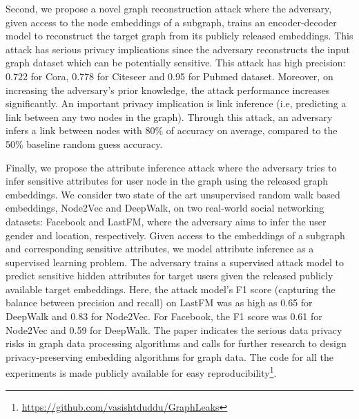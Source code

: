 Second, we propose a novel graph reconstruction attack where the adversary, given access to the node embeddings of a subgraph, trains an encoder-decoder model to reconstruct the target graph from its publicly released embeddings.
This attack has serious privacy implications since the adversary reconstructs the input graph dataset which can be potentially sensitive.
This attack has high precision: 0.722 for Cora, 0.778 for Citeseer and 0.95 for Pubmed dataset.
Moreover, on increasing the adversary's prior knowledge, the attack performance increases significantly.
An important privacy implication is link inference (i.e, predicting a link between any two nodes in the graph).
Through this attack, an adversary infers a link between nodes with 80\% of accuracy on average, compared to the 50\% baseline random guess accuracy.


Finally, we propose the attribute inference attack where the adversary tries to infer sensitive attributes for user node in the graph using the released graph embeddings.
We consider two state of the art unsupervised random walk based embeddings, Node2Vec and DeepWalk, on two real-world social networking datasets: Facebook and LastFM, where the adversary aims to infer the user gender and location, respectively.
Given access to the embeddings of a subgraph and corresponding sensitive attributes, we model attribute inference as a supervised learning problem.
The adversary trains a supervised attack model to predict sensitive hidden attributes for target users given the released publicly available target embeddings.
Here, the attack model's F1 score (capturing the balance between precision and recall) on LastFM was as high as 0.65 for DeepWalk and 0.83 for Node2Vec.
For Facebook, the F1 score was 0.61 for Node2Vec and 0.59 for DeepWalk.
The paper indicates the serious data privacy risks in graph data processing algorithms and calls for further research to design privacy-preserving embedding algorithms for graph data.
%
The code for all the experiments is made publicly available for easy reproducibility\footnote{\url{https://github.com/vasishtduddu/GraphLeaks}}.

